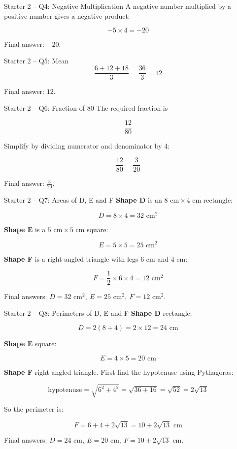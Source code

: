 \documentclass{beamer}
\begin{document}
\begin{frame}{Starter 2 -- Q4: Negative Multiplication}
\small
A negative number multiplied by a positive number gives a negative product:

\[
-5 \times 4 = -20
\]

Final answer: \(\boxed{-20}\).
\end{frame}

\begin{frame}{Starter 2 -- Q5: Mean}
\small
\[
\frac{6+12+18}{3}=\frac{36}{3}=12
\]

Final answer: \(\boxed{12}\).
\end{frame}

\begin{frame}{Starter 2 -- Q6: Fraction of 80}
\small
The required fraction is

\[
\frac{12}{80}
\]

Simplify by dividing numerator and denominator by 4:

\[
\frac{12}{80}=\frac{3}{20}
\]

Final answer: \(\boxed{\frac{3}{20}}\).
\end{frame}

\begin{frame}{Starter 2 -- Q7: Areas of D, E and F}
\small
\textbf{Shape D} is an \(8\text{ cm}\times 4\text{ cm}\) rectangle:

\[
D=8\times 4=32\text{ cm}^2
\]

\textbf{Shape E} is a \(5\text{ cm}\times 5\text{ cm}\) square:

\[
E=5\times 5=25\text{ cm}^2
\]

\textbf{Shape F} is a right-angled triangle with legs \(6\text{ cm}\) and \(4\text{ cm}\):

\[
F=\frac12 \times 6 \times 4=12\text{ cm}^2
\]

Final answers: \(\boxed{D=32\text{ cm}^2,\ E=25\text{ cm}^2,\ F=12\text{ cm}^2}\).
\end{frame}

\begin{frame}{Starter 2 -- Q8: Perimeters of D, E and F}
\small
\textbf{Shape D} rectangle:

\[
D=2(8+4)=2\times 12=24\text{ cm}
\]

\textbf{Shape E} square:

\[
E=4\times 5=20\text{ cm}
\]

\textbf{Shape F} right-angled triangle. First find the hypotenuse using Pythagoras:

\[
\text{hypotenuse}=\sqrt{6^2+4^2}=\sqrt{36+16}=\sqrt{52}=2\sqrt{13}
\]

So the perimeter is:

\[
F=6+4+2\sqrt{13}=10+2\sqrt{13}\text{ cm}
\]

Final answers: \(\boxed{D=24\text{ cm},\ E=20\text{ cm},\ F=10+2\sqrt{13}\text{ cm}}\).
\end{frame}
\end{document}
